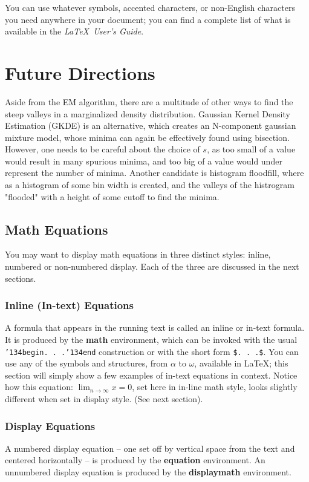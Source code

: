 \documentclass{acm_proc_article-sp}
\begin{document}
You can use whatever symbols, accented characters, or
non-English characters you need anywhere in your document;
you can find a complete list of what is
available in the \textit{\LaTeX\
User's Guide}\cite{Lamport:LaTeX}.


\section{Future Directions}

Aside from the EM algorithm, there are a multitude of other ways to find the steep valleys in a marginalized density distribution. Gaussian Kernel Density Estimation (GKDE) is an alternative, which creates an N-component gaussian mixture model, whose minima can again be effectively found using bisection. However, one needs to be careful about the choice of $s$, as too small of a value would result in many spurious minima, and too big of a value would under represent the number of minima. Another candidate is histogram floodfill, where as a histogram of some bin width is created, and the valleys of the histrogram "flooded" with a height of some cutoff to find the minima. 


\subsection{Math Equations}
You may want to display math equations in three distinct styles:
inline, numbered or non-numbered display.  Each of
the three are discussed in the next sections.

\subsubsection{Inline (In-text) Equations}
A formula that appears in the running text is called an
inline or in-text formula.  It is produced by the
\textbf{math} environment, which can be
invoked with the usual \texttt{{\char'134}begin. . .{\char'134}end}
construction or with the short form \texttt{\$. . .\$}. You
can use any of the symbols and structures,
from $\alpha$ to $\omega$, available in
\LaTeX\cite{Lamport:LaTeX}; this section will simply show a
few examples of in-text equations in context. Notice how
this equation: \begin{math}\lim_{n\rightarrow \infty}x=0\end{math},
set here in in-line math style, looks slightly different when
set in display style.  (See next section).

\subsubsection{Display Equations}
A numbered display equation -- one set off by vertical space
from the text and centered horizontally -- is produced
by the \textbf{equation} environment. An unnumbered display
equation is produced by the \textbf{displaymath} environment.
\end{document}
